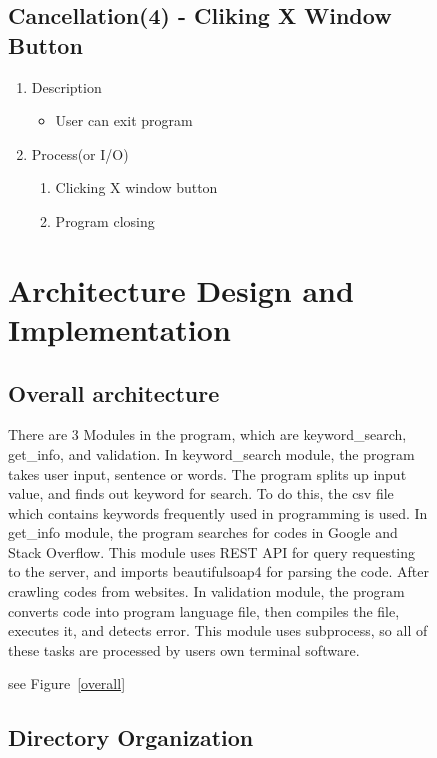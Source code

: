 \documentclass[conference]{IEEEtran}
\begin{document}
\begin{itemize}
\begin{itemize}
\begin{itemize}
\begin{itemize}
\begin{figure}[h]
\begin{enumerate}
\begin{itemize}
\begin{enumerate}
\subsection{Cancellation(4) - Cliking X Window Button}
\begin{enumerate}
  \item Description
  \begin{itemize}
    \item User can exit program
  \end{itemize}
  \item Process(or I/O)
  \begin{enumerate}
    \item Clicking X window button
    \item Program closing
  \end{enumerate}
\end{enumerate}
\textit{}

\section{Architecture Design and Implementation} %
\label{sec:architecture_design_and_implementation}

\subsection{Overall architecture} %
\label{sub:overall_architecture}

There are 3 Modules in the program, which are keyword\_search, get\_info, and validation. In keyword\_search module, the program takes user input, sentence or words. The program splits up input value, and finds out keyword for search. To do this, the csv file which contains keywords frequently used in programming is used. In get\_info module, the program searches for codes in Google and Stack Overflow. This module uses REST API for query requesting to the server, and imports beautifulsoap4 for parsing the code. After crawling codes from websites. In validation module, the program converts code into program language file, then compiles the file, executes it, and detects error. This module uses subprocess, so all of these tasks are processed by users own terminal software.

see Figure~\ref{overall}


\subsection{Directory Organization} %
\label{sub:directory_organization}


\end{enumerate}
\end{itemize}
\end{enumerate}
\end{figure}
\end{itemize}
\end{itemize}
\end{itemize}
\end{itemize}
\end{document}
